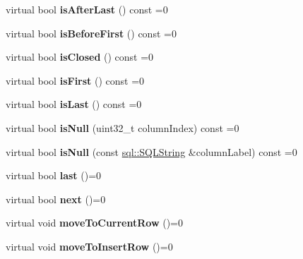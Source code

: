 \begin{DoxyCompactItemize}
\hypertarget{classsql_1_1_result_set_a59e1ba17e250b3c9fa0732ff99bfc127}{}\label{classsql_1_1_result_set_a59e1ba17e250b3c9fa0732ff99bfc127} 
virtual bool {\bfseries is\+After\+Last} () const =0
\item 
\hypertarget{classsql_1_1_result_set_a4fce425b12aa203a1e85ae250b83fb3b}{}\label{classsql_1_1_result_set_a4fce425b12aa203a1e85ae250b83fb3b} 
virtual bool {\bfseries is\+Before\+First} () const =0
\item 
\hypertarget{classsql_1_1_result_set_ae6f9f414dbdadb9c5f7f544c7f6ead98}{}\label{classsql_1_1_result_set_ae6f9f414dbdadb9c5f7f544c7f6ead98} 
virtual bool {\bfseries is\+Closed} () const =0
\item 
\hypertarget{classsql_1_1_result_set_a0f5a580429cdcbdc52098b59c542455c}{}\label{classsql_1_1_result_set_a0f5a580429cdcbdc52098b59c542455c} 
virtual bool {\bfseries is\+First} () const =0
\item 
\hypertarget{classsql_1_1_result_set_ab50e2b380406f41e7af08db61ce0b868}{}\label{classsql_1_1_result_set_ab50e2b380406f41e7af08db61ce0b868} 
virtual bool {\bfseries is\+Last} () const =0
\item 
\hypertarget{classsql_1_1_result_set_a0461963d87f0ec97bb79e1cfd194aefb}{}\label{classsql_1_1_result_set_a0461963d87f0ec97bb79e1cfd194aefb} 
virtual bool {\bfseries is\+Null} (uint32\+\_\+t column\+Index) const =0
\item 
\hypertarget{classsql_1_1_result_set_a8fc458f77134d35d99594779290dc38c}{}\label{classsql_1_1_result_set_a8fc458f77134d35d99594779290dc38c} 
virtual bool {\bfseries is\+Null} (const \hyperlink{classsql_1_1_s_q_l_string}{sql\+::\+S\+Q\+L\+String} \&column\+Label) const =0
\item 
\hypertarget{classsql_1_1_result_set_ad1e588439db2b921b9142c284bb4d4c0}{}\label{classsql_1_1_result_set_ad1e588439db2b921b9142c284bb4d4c0} 
virtual bool {\bfseries last} ()=0
\item 
\hypertarget{classsql_1_1_result_set_a5b5fa996955fc5728c489ee9fc9ed8f4}{}\label{classsql_1_1_result_set_a5b5fa996955fc5728c489ee9fc9ed8f4} 
virtual bool {\bfseries next} ()=0
\item 
\hypertarget{classsql_1_1_result_set_a5b119645a7bcb5a1171dee187beee66c}{}\label{classsql_1_1_result_set_a5b119645a7bcb5a1171dee187beee66c} 
virtual void {\bfseries move\+To\+Current\+Row} ()=0
\item 
\hypertarget{classsql_1_1_result_set_a90b8236ae32984671e3656a7ba5b7f39}{}\label{classsql_1_1_result_set_a90b8236ae32984671e3656a7ba5b7f39} 
virtual void {\bfseries move\+To\+Insert\+Row} ()=0

\end{DoxyCompactItemize}
